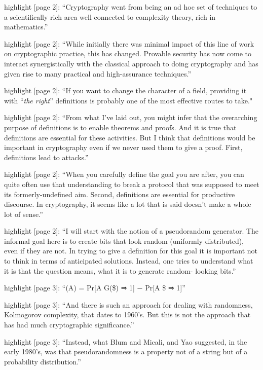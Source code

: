 highlight {[}page 2{]}: ``Cryptography went from being an ad hoc set of techniques to a scientifically rich area well connected to complexity theory, rich in mathematics.''

highlight {[}page 2{]}: ``While initially there was minimal impact of
this line of work on cryptographic practice, this has changed. Provable
security has now come to interact synergistically with the classical approach to doing cryptography and has given rise to many practical and
high-assurance techniques.''

highlight {[}page 2{]}: ``If you want to change the character of a field, providing it with ``\emph{the right}'' definitions is probably one of the most effective routes to take."

highlight {[}page 2{]}: ``From what I've laid out, you might infer that
the overarching purpose of definitions is to enable theorems and
proofs. And it is true that definitions are essential for these
activities. But I think that definitions would be important in
cryptography even if we never used them to give a proof. First, definitions lead to attacks.''

highlight {[}page 2{]}: ``When you carefully define the goal you are
after, you can quite often use that understanding to break a protocol
that was supposed to meet its formerly-undefined aim. Second,
definitions are essential for productive discourse. In cryptography, it seems like a lot that is said doesn't make a whole lot of sense.''

highlight {[}page 2{]}: ``I will start with the notion of a pseudorandom generator. The informal goal here is to create bits that look random (uniformly distributed), even if they are not. In trying to give a
definition for this goal it is important not to think in terms of
anticipated solutions. Instead, one tries to understand what it is
that the question means, what it is to generate random- looking bits.''

highlight {[}page 3{]}: ``(A) = Pr{[}A G(\$) ⇒ 1{]} − Pr{[}A \$ ⇒ 1{]}''

highlight {[}page 3{]}: ``And there is such an approach for dealing with
randomness, Kolmogorov complexity, that dates to 1960's. But this is not
the approach that has had much cryptographic significance.''

highlight {[}page 3{]}: ``Instead, what Blum and Micali, and Yao
suggested, in the early 1980's, was that pseudorandomness is a property
not of a string but of a probability distribution.''

